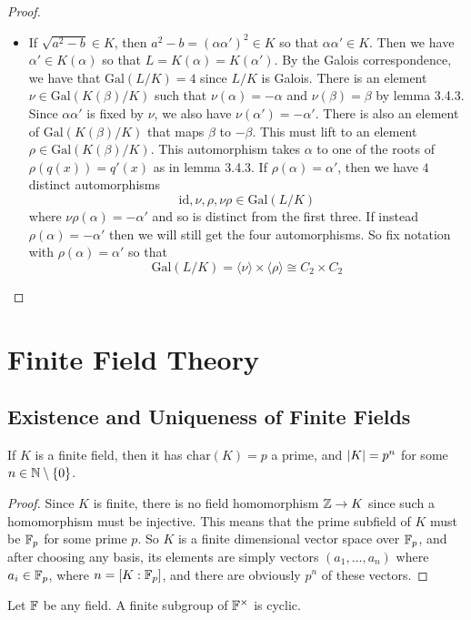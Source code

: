 \documentclass[a4paper]{article}
\begin{document}
\begin{thm}{}{}
\begin{proof}
\begin{itemize}
\item If $\sqrt{a^2-b}\in K$, then $a^2-b=(\alpha\alpha')^2\in K$ so that $\alpha\alpha'\in K$. Then we have $\alpha'\in K(\alpha)$ so that $L=K(\alpha)=K(\alpha')$. By the Galois correspondence, we have that $\text{Gal}(L/K)=4$ since $L/K$ is Galois. There is an element $\nu\in\text{Gal}(K(\beta)/K)$ such that $\nu(\alpha)=-\alpha$ and $\nu(\beta)=\beta$ by lemma 3.4.3. Since $\alpha\alpha'$ is fixed by $\nu$, we also have $\nu(\alpha')=-\alpha'$. There is also an element of $\text{Gal}(K(\beta)/K)$ that maps $\beta$ to $-\beta$. This must lift to an element $\rho\in\text{Gal}(K(\beta)/K)$. This automorphism takes $\alpha$ to one of the roots of $\rho(q(x))=q'(x)$ as in lemma 3.4.3.  If $\rho(\alpha)=\alpha'$, then we have $4$ distinct automorphisms $$\text{id},\nu,\rho,\nu\rho\in\text{Gal}(L/K)$$ where $\nu\rho(\alpha)=-\alpha'$ and so is distinct from the first three. If instead $\rho(\alpha)=-\alpha'$ then we will still get the four automorphisms. So fix notation with $\rho(\alpha)=\alpha'$ so that $$\text{Gal}(L/K)=\langle\nu\rangle\times\langle\rho\rangle\cong C_2\times C_2$$
\end{itemize}
\end{proof}
\end{thm}

\pagebreak
\section{Finite Field Theory}
\subsection{Existence and Uniqueness of Finite Fields}
\begin{prp}{}{} If $K$ is a finite field, then it has $\text{char}(K)=p$ a prime, and $\abs{K}=p^n$ for some $n\in\mathbb{N}\setminus\{0\}$. \tcbline
\begin{proof}
Since $K$ is finite, there is no field homomorphism $\mathbb{Z}\to K$ since such a homomorphism must be injective. This means that the prime subfield of $K$ must be $\mathbb{F}_p$ for some prime $p$. So $K$ is a finite dimensional vector space over $\mathbb{F}_p$, and after choosing any basis, its elements are simply vectors $(a_1,\dots,a_n)$ where $a_i\in\mathbb{F}_p$, where $n=[K:\mathbb{F}_p]$, and there are obviously $p^n$ of these vectors. 
\end{proof}
\end{prp}

\begin{lmm}{}{} Let $\mathbb{F}$ be any field. A finite subgroup of $\mathbb{F}^\times$ is cyclic. 
\end{lmm}
\end{document}
